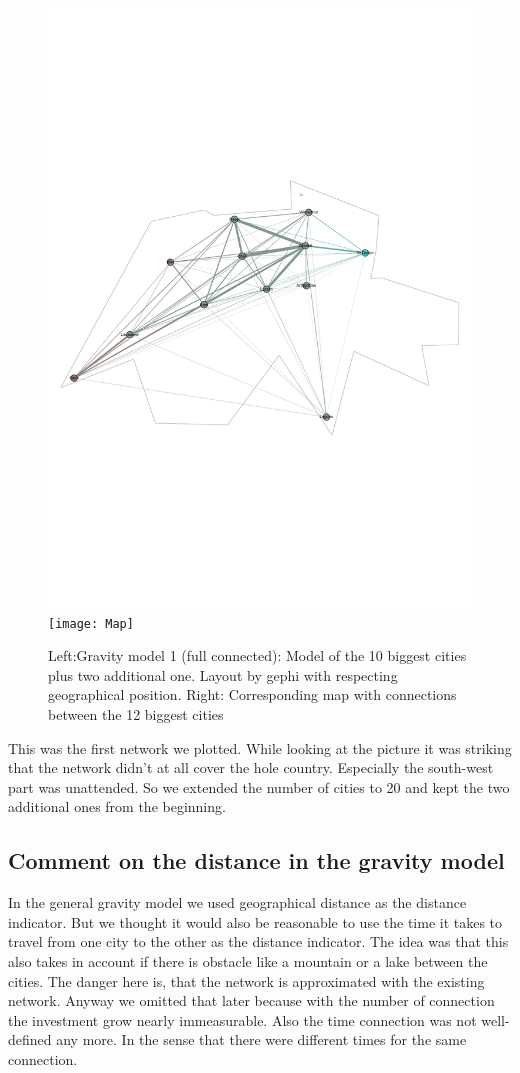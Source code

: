 \documentclass[11pt]{article}
\begin{document}
\begin{figure}
\centering
\includegraphics[scale=0.25]{switzerland_network1}
\hfill
\texttt{[image: Map]}
 \caption{Left:Gravity model 1 (full connected): Model of the 10 biggest cities plus two additional one. Layout by gephi with respecting geographical position. Right: Corresponding map with connections between the 12 biggest cities}
\end{figure}

This was the first network we plotted. While looking at the picture it was striking that the network didn't at all cover the hole country. Especially the south-west part was unattended. So we extended the number of cities to 20 and kept the two additional ones from the beginning.


\subsection{Comment on the distance in the gravity model}
In the general gravity model we used geographical distance as the distance indicator. But we thought it would also be reasonable to use the time it takes to travel from one city to the other as the distance indicator. The idea was that this also takes in account if there is obstacle like a mountain or a lake between the cities. The danger here is, that the network is approximated with the existing network. Anyway we omitted that later because with the number of connection the investment grow nearly immeasurable. Also the time connection was not well-defined any more. In the sense that there were different times for the same connection.
\end{document}
